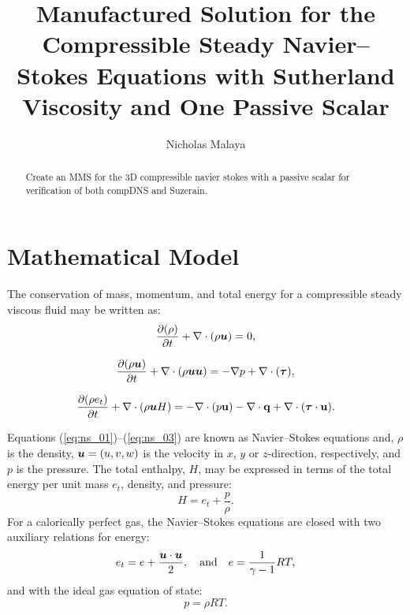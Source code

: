 \documentclass[10pt]{article}
\title{Manufactured Solution for the Compressible Steady Navier--Stokes Equations with Sutherland Viscosity and One Passive Scalar}
\author{Nicholas Malaya}
\newcommand{\D}{\partial}
\newcommand{\bv}[1]{\ensuremath{\mbox{\boldmath$ #1 $}}}
\begin{document}
\maketitle

\begin{abstract}
  Create an MMS for the 3D compressible navier stokes with a passive scalar 
  for verification of both compDNS and Suzerain. 
\end{abstract}

\section{Mathematical Model}
The conservation of mass, momentum, and total energy for a compressible steady viscous fluid may be written as:
\begin{equation}
 \label{eq:ns_01}
 \frac{ \D (\rho)}{\D t}+\nabla \cdot \left(\rho \bv{u}\right) = 0,
\end{equation}

\begin{equation}
 \label{eq:ns_02}
 \frac{ \D (\rho \bv{u})}{\D t} + \nabla\cdot\left(\rho\bv{u}\bv{u}\right) = -\nabla p+  \nabla \cdot (\bv{\tau} ),
\end{equation}

\begin{equation}
 \label{eq:ns_03}
 \frac{ \D (\rho e_t)}{\D t} + \nabla\cdot\left(\rho \bv{u} H\right) =-   \nabla\cdot(p  \mathbf{u}) -\nabla\cdot \mathbf{q} +  \nabla \cdot (\bv{\tau} \cdot \mathbf{u}).
\end{equation}

Equations (\ref{eq:ns_01})--(\ref{eq:ns_03}) are known as Navier--Stokes equations and, $\rho$ is the density, $\bv{u}=(u,v,w)$ is the velocity in $x$, $y$ or $z$-direction, respectively,    and $p$ is the pressure. The total enthalpy, $H$, may be expressed in terms of the total energy per unit mass $e_t$, density, and pressure:
$$H = e_t + \dfrac{p}{\rho}.$$
For a calorically perfect gas, the Navier--Stokes equations are closed with two auxiliary relations for energy:
\begin{equation}
 \label{eq:ns_04}
e_t= e+\dfrac{\bv{u}\cdot \bv{u}}{2},\quad\mbox{and}\quad e=\dfrac{1}{\gamma -1}RT ,
\end{equation}
and with the ideal gas equation of state:
\begin{equation}
 \label{eq:ns_05}
p=\rho RT.
\end{equation}
\end{document}
